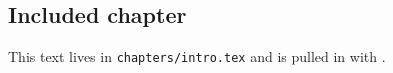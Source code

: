 \subsection{Included chapter}
This text lives in \texttt{chapters/intro.tex} and is pulled in with \verb||.
